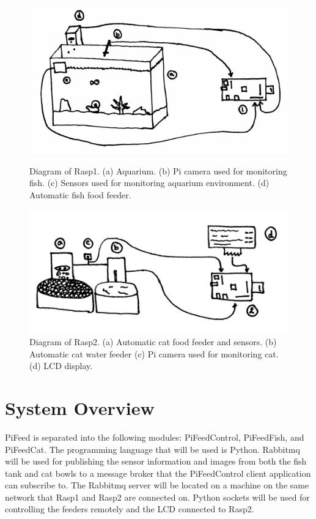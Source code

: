 \begin{figure}[H]
    \centering
    \begin{minipage}[b]{0.45\linewidth}
        \centering
        \captionsetup{justification=centering, margin = 0.5cm}
        \includegraphics[scale=0.3]{images/FishTank} 
        \caption{Diagram of Rasp1. (a) Aquarium. (b) Pi camera used for
        monitoring fish. (c) Sensors used for monitoring aquarium environment.
        (d) Automatic fish food feeder.}
        \label{fig:highFish}
    \end{minipage}
    \quad
    \begin{minipage}[b]{0.45\linewidth}
        \centering
        \captionsetup{justification=centering, margin = 0.5cm}
        \includegraphics[scale=0.4]{images/Cat} 
        \caption{Diagram of Rasp2. (a) Automatic cat food feeder and sensors.
        (b) Automatic cat water feeder (c) Pi camera used for monitoring cat.
        (d) LCD display.}
        \label{fig:highCat}
    \end{minipage}
\end{figure}

\section{System Overview}
PiFeed is separated into the following modules: PiFeedControl, PiFeedFish, and
PiFeedCat. The programming language that will be used is Python. Rabbitmq will
be used for publishing the sensor information and images from both the fish tank
and cat bowls to a message broker that the PiFeedControl client application can
subscribe to. The Rabbitmq server will be located on a machine on the same
network that Rasp1 and Rasp2 are connected on. Python sockets will be used for
controlling the feeders remotely and the LCD connected to Rasp2.

